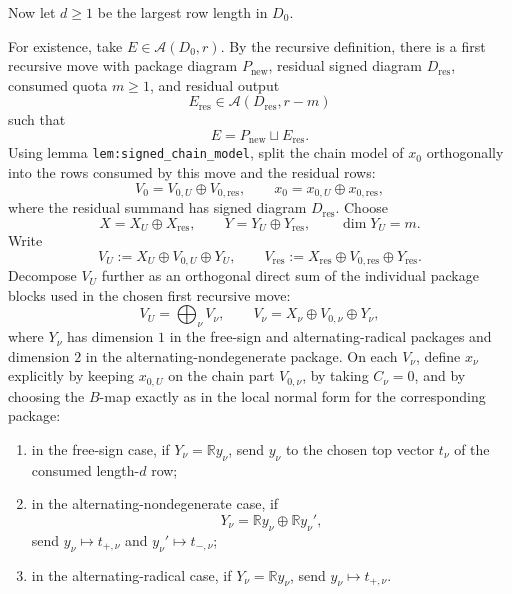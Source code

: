 \documentclass[
]{article}
\providecommand{\tightlist}{%
  \setlength{\itemsep}{0pt}\setlength{\parskip}{0pt}}
\begin{document}
Now let \(d\ge 1\) be the largest row length in \(D_0\).

For existence, take \(E\in \mathcal A(D_0,r)\). By the recursive
definition, there is a first recursive move with package diagram
\(P_{\mathrm{new}}\), residual signed diagram \(D_{\mathrm{res}}\),
consumed quota \(m\ge 1\), and residual output \[
E_{\mathrm{res}}\in \mathcal A(D_{\mathrm{res}},r-m)
\] such that \[
E=P_{\mathrm{new}}\sqcup E_{\mathrm{res}}.
\] Using lemma \texttt{lem:signed\_chain\_model}, split the chain model
of \(x_0\) orthogonally into the rows consumed by this move and the
residual rows: \[
V_0=V_{0,U}\oplus V_{0,\mathrm{res}},
\qquad
x_0=x_{0,U}\oplus x_{0,\mathrm{res}},
\] where the residual summand has signed diagram \(D_{\mathrm{res}}\).
Choose \[
X=X_U\oplus X_{\mathrm{res}},
\qquad
Y=Y_U\oplus Y_{\mathrm{res}},
\qquad
\dim Y_U=m.
\] Write \[
V_U:=X_U\oplus V_{0,U}\oplus Y_U,
\qquad
V_{\mathrm{res}}:=X_{\mathrm{res}}\oplus V_{0,\mathrm{res}}\oplus Y_{\mathrm{res}}.
\] Decompose \(V_U\) further as an orthogonal direct sum of the
individual package blocks used in the chosen first recursive move: \[
V_U=\bigoplus_{\nu} V_{\nu},
\qquad
V_{\nu}=X_{\nu}\oplus V_{0,\nu}\oplus Y_{\nu},
\] where \(Y_{\nu}\) has dimension \(1\) in the free-sign and
alternating-radical packages and dimension \(2\) in the
alternating-nondegenerate package. On each \(V_{\nu}\), define
\(x_{\nu}\) explicitly by keeping \(x_{0,U}\) on the chain part
\(V_{0,\nu}\), by taking \(C_{\nu}=0\), and by choosing the \(B\)-map
exactly as in the local normal form for the corresponding package:

\begin{enumerate}
\def\labelenumi{\arabic{enumi}.}
\tightlist
\item
  in the free-sign case, if \(Y_{\nu}=\mathbb R y_{\nu}\), send
  \(y_{\nu}\) to the chosen top vector \(t_{\nu}\) of the consumed
  length-\(d\) row;
\item
  in the alternating-nondegenerate case, if \[
  Y_{\nu}=\mathbb R y_{\nu}\oplus \mathbb R y_{\nu}',
  \] send \(y_{\nu}\mapsto t_{+,\nu}\) and
  \(y_{\nu}'\mapsto t_{-,\nu}\);
\item
  in the alternating-radical case, if \(Y_{\nu}=\mathbb R y_{\nu}\),
  send \(y_{\nu}\mapsto t_{+,\nu}\).
\end{enumerate}
\end{document}
